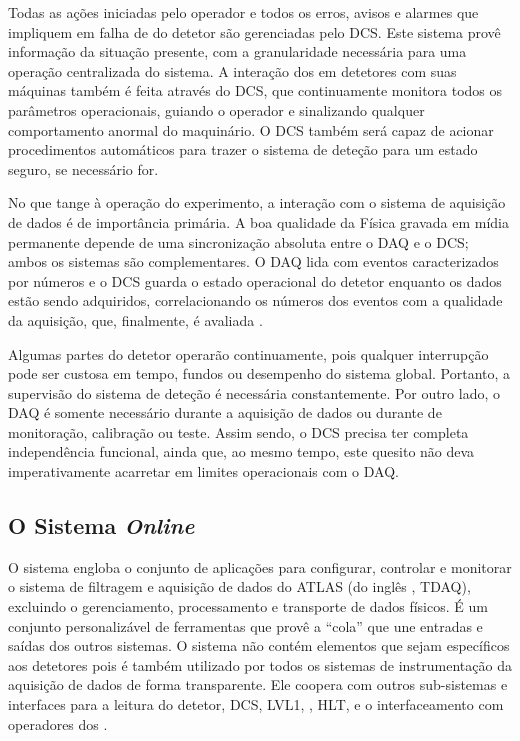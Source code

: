 Todas as ações iniciadas pelo operador e todos os erros, avisos e alarmes que
impliquem em falha de  do detetor são gerenciadas pelo DCS. Este
sistema provê informação  da situação presente, com a
granularidade necessária para uma operação centralizada do sistema. A
interação dos  em detetores com suas máquinas também é feita
através do DCS, que continuamente monitora todos os parâmetros operacionais,
guiando o operador e sinalizando qualquer comportamento anormal do
maquinário. O DCS também será capaz de acionar procedimentos automáticos para
trazer o sistema de deteção para um estado seguro, se necessário for.

No que tange à operação do experimento, a interação com o sistema de aquisição
de dados é de importância primária. A boa qualidade da Física gravada em mídia
permanente depende de uma sincronização absoluta entre o DAQ e o DCS; ambos os
sistemas são complementares. O DAQ lida com eventos caracterizados por números
e o DCS guarda o estado operacional do detetor enquanto os dados estão sendo
adquiridos, correlacionando os números dos eventos com a qualidade da
aquisição, que, finalmente, é avaliada .

Algumas partes do detetor operarão continuamente, pois qualquer interrupção
pode ser custosa em tempo, fundos ou desempenho do sistema global. Portanto, a
supervisão do sistema de deteção é necessária constantemente. Por outro lado,
o DAQ é somente necessário durante a aquisição de dados ou durante 
de monitoração, calibração ou teste. Assim sendo, o DCS precisa ter completa
independência funcional, ainda que, ao mesmo tempo, este quesito não deva
imperativamente acarretar em limites operacionais com o DAQ.

\subsection{O Sistema \textit{Online}}
\label{sec:online}

O sistema  engloba o conjunto de aplicações para configurar,
controlar e monitorar o sistema de filtragem e aquisição de dados do ATLAS (do
inglês , TDAQ), excluindo o gerenciamento,
processamento e transporte de dados físicos. É um conjunto personalizável de
ferramentas que provê a ``cola'' que une entradas e saídas dos outros
sistemas. O sistema  não contém elementos que sejam específicos
aos detetores pois é também utilizado por todos os sistemas de instrumentação
da aquisição de dados de forma transparente. Ele coopera com outros
sub-sistemas e interfaces para a leitura do detetor, DCS, LVL1,
, HLT,  e o interfaceamento com operadores dos
.

